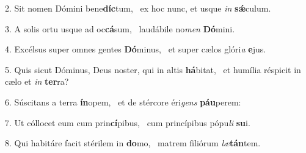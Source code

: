 2. Sit nomen Dómini bene\textbf{díc}tum, \ast\  ex hoc nunc, et usque \textit{in} \textbf{sǽ}culum.\

3. A solis ortu usque ad oc\textbf{cá}sum, \ast\  laudábile no\textit{men} \textbf{Dó}mini.\

4. Excélsus super omnes gentes \textbf{Dó}minus, \ast\  et super cælos glóri\textit{a} \textbf{e}jus.\

5. Quis sicut Dóminus, Deus noster, qui in altis \textbf{há}bitat, \ast\  et humília réspicit in cælo et \textit{in} \textbf{ter}ra?\

6. Súscitans a terra \textbf{ín}opem, \ast\  et de stércore éri\textit{gens} \textbf{páu}perem:\

7. Ut cóllocet eum cum prin\textbf{cí}pibus, \ast\  cum princípibus pópu\textit{li} \textbf{su}i.\

8. Qui habitáre facit stérilem in \textbf{do}mo, \ast\  matrem filiórum \textit{læ}\textbf{tán}tem.\

